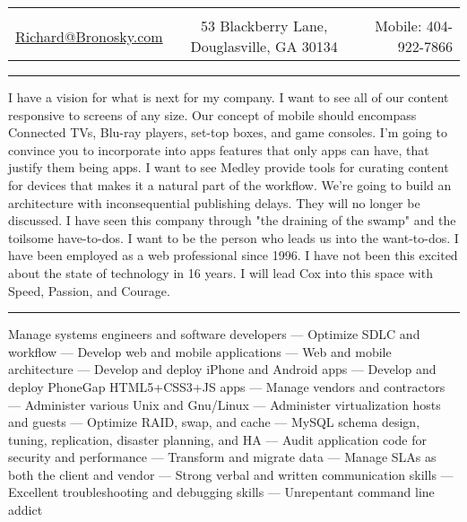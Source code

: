 \documentclass[10pt]{article}
\makeatletter
\newcommand{\heading}[4]{
    \begin{center}
    \begin{tabular*}{\textwidth}{@{\extracolsep{\fill}}lcr}
    &\huge{\textbf{\sc{#1}}}&\\
    \href{mailto:#2}{\small #2} & \small #3 & \small Mobile: #4\\
    \hline\hline
    \end{tabular*}
    \end{center}
}
\newcounter{blocktitlechildren}
\newcommand{\blocktitle}[1]{
    \blocktitlechild{2mm}
    \setcounter{blocktitlechildren}{0}
    {{\sc{#1}\vspace{1.5mm}\hrule}\vspace*{1.5mm}}
}
\newcommand{\blocktitlechild}[2][]{
    \ifthenelse{\equal{\value{blocktitlechildren}}{0}}{}{\vspace{#2}#1}
    \addtocounter{blocktitlechildren}{1}
}
\newenvironment{longtext}[1]{\small {#1}}
\makeatother
\begin{document}
\heading{Richard Paul Bronosky}
{Richard@Bronosky.com}
{53 Blackberry Lane, Douglasville, GA 30134}
{404-922-7866}

\blocktitle{Objective}
\begin{longtext}
    I have a vision for what is next for my company.
    I want to see all of our content responsive to screens of any size.
    Our concept of mobile should encompass Connected TVs, Blu-ray players, set-top boxes, and game consoles.
    I'm going to convince you to incorporate into apps features that only apps can have, that justify them being apps.
    I want to see Medley provide tools for curating content for devices that makes it a natural part of the workflow.
    We're going to build an architecture with inconsequential publishing delays. They will no longer be discussed.
    I have seen this company through "the draining of the swamp" and the toilsome have-to-dos. I want to be the person who leads us into the want-to-dos.
\end{longtext}
\vspace{2mm}
\begin{longtext}
    I have been employed as a web professional since 1996. I have not been this excited about the state of technology in 16 years. I will lead Cox into this space with Speed, Passion, and Courage.
\end{longtext}
\vspace{2mm}

\blocktitle{Overview}
\begin{longtext}
    Manage systems engineers and software developers ---
    Optimize SDLC and workflow ---
    Develop web and mobile applications ---
    Web and mobile architecture ---
    Develop and deploy iPhone and Android apps ---
    Develop and deploy PhoneGap HTML5+CSS3+JS apps ---
    Manage vendors and contractors ---
    Administer various Unix and Gnu/Linux ---
    Administer virtualization hosts and guests ---
    Optimize RAID, swap, and cache ---
    MySQL schema design, tuning, replication, disaster planning, and HA ---
    Audit application code for security and performance ---
    Transform and migrate data ---
    Manage SLAs as both the client and vendor ---
    Strong verbal and written communication skills ---
    Excellent troubleshooting and debugging skills ---
    Unrepentant command line addict
\end{longtext}
\vspace{2mm}
\end{document}
